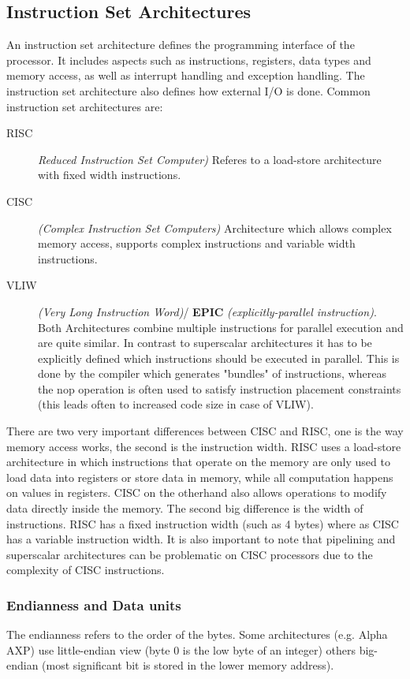 \documentclass[a4paper,10pt]{article}
\begin{document}
\subsection{Instruction Set Architectures}
An instruction set architecture defines the programming interface of the processor. It includes aspects such as instructions, registers,
data types and memory access, as well as interrupt handling and exception handling. The instruction set architecture also defines how
external I/O is done. Common instruction set architectures are:
\begin{description}
 \item[RISC] \textit{Reduced Instruction Set Computer)} Referes to a load-store architecture with fixed width instructions.
 \item[CISC] \textit{(Complex Instruction Set Computers)} Architecture which allows complex memory access, supports complex instructions
       and variable width instructions.
 \item[VLIW] \textit{(Very Long Instruction Word)}/ \textbf{EPIC} \emph{(explicitly-parallel instruction)}. Both Architectures combine multiple instructions for parallel execution and are quite similar. In contrast to superscalar architectures it has to be explicitly defined which instructions should be executed in parallel. This is done by the compiler which generates "bundles" of instructions, whereas the nop operation is often used to satisfy instruction placement constraints (this leads often to increased code size in case of VLIW).
\end{description}

There are two very important differences between CISC and RISC, one is the way memory access works, the second is the instruction width.
RISC uses a load-store architecture in which instructions that operate on the memory are only used to load data into registers or store
data in memory, while all computation happens on values in registers. CISC on the otherhand also allows operations to modify data directly inside
the memory. The second big difference is the width of instructions. RISC has a fixed instruction width (such as 4 bytes) where as CISC
has a variable instruction width. It is also important to note that pipelining and superscalar architectures can be problematic on CISC processors due to the complexity of CISC instructions.


\subsubsection*{Endianness and Data units}
The endianness refers to the order of the bytes. Some architectures (e.g. Alpha AXP) use little-endian view (byte 0 is the low byte of an integer) others big-endian (most significant bit is stored in the lower memory address).
\end{document}
